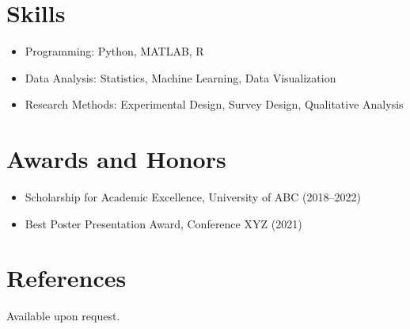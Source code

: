 \documentclass[11pt,a4paper]{article}
\begin{document}
\section*{Skills}
\begin{itemize}[leftmargin=0.5cm,itemsep=1ex]
  \item Programming: Python, MATLAB, R
  \item Data Analysis: Statistics, Machine Learning, Data Visualization
  \item Research Methods: Experimental Design, Survey Design, Qualitative Analysis
\end{itemize}

\section*{Awards and Honors}
\begin{itemize}[leftmargin=0.5cm,itemsep=1ex]
  \item Scholarship for Academic Excellence, University of ABC (2018--2022)
  \item Best Poster Presentation Award, Conference XYZ (2021)
\end{itemize}

\section*{References}
Available upon request.
\end{document}
